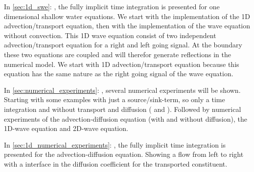 In \autoref{sec:1d_swe}: , the fully implicit time integration is presented for one dimensional shallow water equations.
We start with the implementation of the 1D advection/transport equation, then with the implementation of the wave equation without convection.
This 1D wave equation consist of two independent advection/transport equation for a right and left going signal.
At the boundary these two equations are coupled and will therefor generate reflections in the numerical model.
We start with 1D advection/transport equation because this equation has the same nature as the right going signal of the wave equation.


In \autoref{sec:numerical_experiments}: , several numerical experiments will be shown.
Starting with some examples with just a source/sink-term, so only a time integration and without transport and diffusion ( and ).
Followed by numerical experiments of the advection-diffusion equation (with and without diffusion), the 1D-wave equation and 2D-wave equation.

In \autoref{sec:1d_numerical_experiments}: , the fully implicit time integration is presented for the advection-diffusion equation.
Showing a flow from left to right with a interface in the diffusion coefficient for the transported constituent.


